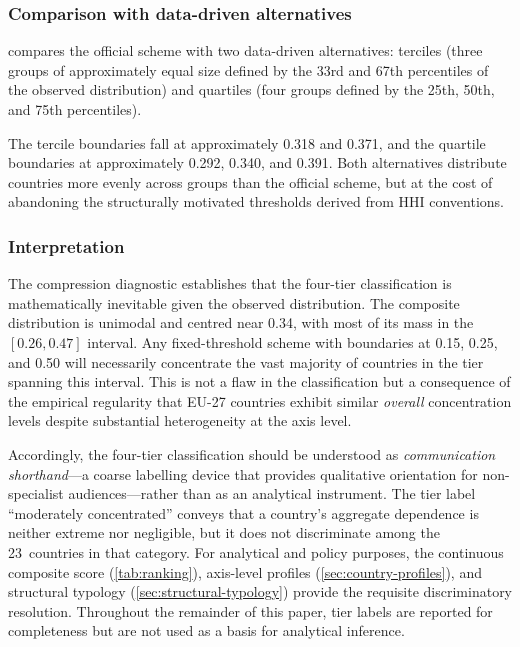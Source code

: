 \subsubsection{Comparison with data-driven alternatives}

 compares the official scheme with
two data-driven alternatives: terciles (three groups of approximately
equal size defined by the 33rd and 67th percentiles of the observed
distribution) and quartiles (four groups defined by the 25th, 50th,
and 75th percentiles).



The tercile boundaries fall at approximately 0.318 and 0.371, and the
quartile boundaries at approximately 0.292, 0.340, and 0.391.  Both
alternatives distribute countries more evenly across groups than the
official scheme, but at the cost of abandoning the structurally
motivated thresholds derived from HHI conventions.

\subsubsection{Interpretation}

The compression diagnostic establishes that the four-tier classification
is mathematically inevitable given the observed distribution.  The
composite distribution is unimodal and centred near 0.34, with most
of its mass in the $[0.26, 0.47]$ interval.  Any fixed-threshold
scheme with boundaries at 0.15, 0.25, and 0.50 will necessarily
concentrate the vast majority of countries in the tier spanning this
interval.  This is not a flaw in the classification but a consequence
of the empirical regularity that EU-27 countries exhibit similar
\emph{overall} concentration levels despite substantial heterogeneity
at the axis level.

Accordingly, the four-tier classification should be understood as
\emph{communication shorthand}---a coarse labelling device that
provides qualitative orientation for non-specialist audiences---rather
than as an analytical instrument.  The tier label ``moderately
concentrated'' conveys that a country's aggregate dependence is
neither extreme nor negligible, but it does not discriminate among
the 23~countries in that category.  For analytical and policy
purposes, the continuous composite score (\cref{tab:ranking}),
axis-level profiles (\cref{sec:country-profiles}), and structural
typology (\cref{sec:structural-typology}) provide the requisite
discriminatory resolution.  Throughout the remainder of this paper,
tier labels are reported for completeness but are not used as a
basis for analytical inference.

